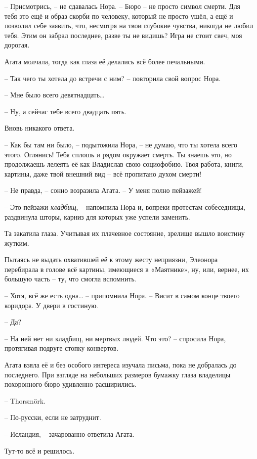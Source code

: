 \documentclass[
  a5paperpaper,
  DIV=11,
  numbers=noendperiod]{scrreprt}
\begin{document}
-- Присмотрись, -- не сдавалась Нора. -- Бюро -- не просто символ
смерти. Для тебя это ещё и образ скорби по человеку, который не просто
ушёл, а ещё и позволил себе заявить, что, несмотря на твои глубокие
чувства, никогда не любил тебя. Этим он забрал последнее, разве ты не
видишь? Игра не стоит свеч, моя дорогая.

Агата молчала, тогда как глаза её делались всё более печальными.

-- Так чего ты хотела до встречи с ним? -- повторила свой вопрос Нора.

-- Мне было всего девятнадцать\ldots{}

-- Ну, а сейчас тебе всего двадцать пять.

Вновь никакого ответа.

-- Как бы там ни было, -- подытожила Нора, -- не думаю, что ты хотела
всего этого. Оглянись! Тебя сплошь и рядом окружает смерть. Ты знаешь
это, но продолжаешь лелеять её как Владислав свою социофобию. Твоя
работа, книги, картины, даже твой внешний вид -- всё пропитано духом
смерти!

-- Не правда, -- сонно возразила Агата. -- У меня полно пейзажей!

-- Это пейзажи \emph{кладбищ}, -- напомнила Нора и, вопреки протестам
собеседницы, раздвинула шторы, карниз для которых уже успели заменить.

Та закатила глаза. Учитывая их плачевное состояние, зрелище вышло
воистину жутким.

Пытаясь не выдать охватившей её к этому жесту неприязни, Элеонора
перебирала в голове всё картины, имеющиеся в «Маятнике», ну, или,
вернее, их большую часть -- ту, что смогла вспомнить.

-- Хотя, всё же есть одна\ldots{} -- припомнила Нора. -- Висит в самом
конце твоего коридора. У двери в гостиную.

-- Да?

-- На ней нет ни кладбищ, ни мертвых людей. Что это? -- спросила Нора,
протягивая подруге стопку конвертов.

Агата взяла её и без особого интереса изучала письма, пока не добралась
до последнего. При взгляде на небольших размеров бумажку глаза владелицы
похоронного бюро удивленно расширились.

-- Thorsmörk.

-- По-русски, если не затруднит.

-- Исландия, -- зачарованно ответила Агата.

Тут-то всё и решилось.
\end{document}
